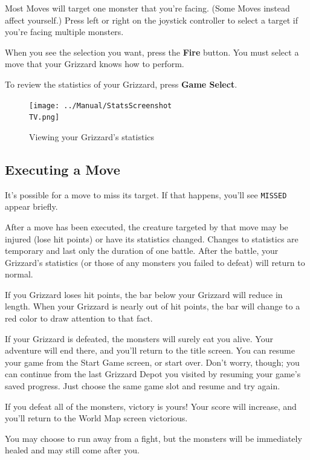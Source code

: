 \documentclass[10pt,twocolumn,openany,article]{memoir}
\newcommand\TV{NTSC}
\newcommand\TV{PAL}
\newcommand\TV{SECAM}
\begin{document}
Most  Moves will  target one  monster  that you're  facing. (Some  Moves
instead affect yourself.) Press left or right on the joystick controller
to select a target if you're facing multiple monsters.

When you  see the selection  you want, press  the \textbf{Fire} button.  You must
select a move that your Grizzard knows how to perform.

To review the statistics of your Grizzard, press \textbf{Game Select}.

\begin{figure}[t]
  \texttt{[image: ../Manual/StatsScreenshot\\TV.png]}
  \caption{Viewing your Grizzard's statistics}
\end{figure}

\subsection{Executing a Move}

It's possible for a move to miss its target. If that happens, you'll see
\texttt{MISSED} appear briefly.

After a move  has been executed, the creature targeted  by that move may
be injured (lose hit points) or  have its statistics changed. Changes to
statistics  are temporary  and last  only  the duration  of one  battle.
After the battle,  your Grizzard's statistics (or those  of any monsters
you failed to defeat) will return to normal.

If  you Grizzard  loses hit  points, the  bar below  your Grizzard  will
reduce in  length. When your Grizzard  is nearly out of  hit points, the
bar will change to a red color to draw attention to that fact.

If your  Grizzard is defeated, the  monsters will surely eat  you alive.
Your adventure will end there, and you'll return to the title screen.
\ifdefined\NOSAVE
You can  resume your  game from  the Start Game  screen, or  start over.
\else
Don't worry, though;  you can continue from the last  Grizzard Depot you
visited by  resuming your  game's saved progress.  Just choose  the same
game slot and resume and try again.
\fi

If you  defeat all of  the monsters, victory  is yours! Your  score will
increase, and you'll return to the World Map screen victorious.

You  may choose  to run  away from  a fight,  but the  monsters will  be
immediately healed and may still come after you.
\end{document}
